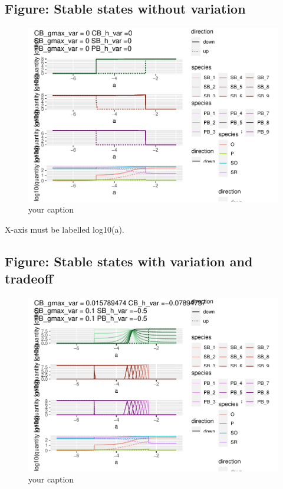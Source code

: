 \documentclass{article}
\begin{document}
\hypertarget{figure-stable-states-without-variation}{%
\subsection{Figure: Stable states without
variation}\label{figure-stable-states-without-variation}}

\begin{figure}

{\centering \includegraphics[width=1\linewidth]{article_files/figure-latex/ss_novar-1} 

}

\caption{your caption}\label{fig:ss_novar}
\end{figure}

X-axis must be labelled log10(a).

\hypertarget{figure-stable-states-with-variation-and-tradeoff}{%
\subsection{Figure: Stable states with variation and
tradeoff}\label{figure-stable-states-with-variation-and-tradeoff}}

\begin{figure}

{\centering \includegraphics[width=1\linewidth]{article_files/figure-latex/ss_var-1} 

}

\caption{your caption}\label{fig:ss_var}
\end{figure}
\end{document}
